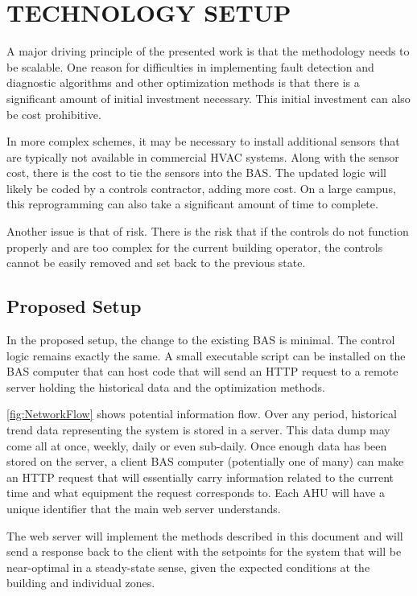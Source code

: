 \chapter{\texorpdfstring{\MakeUppercase{Technology Setup}}{Technology Setup}}

A major driving principle of the presented work is that the methodology
needs to be scalable. One reason for difficulties in implementing fault
detection and diagnostic algorithms and other optimization methods is
that there is a significant amount of initial investment necessary. This
initial investment can also be cost prohibitive. 

In more complex schemes, it may be necessary to install additional
sensors that are typically not available in commercial HVAC systems.
Along with the sensor cost, there is the cost to tie the sensors into the
BAS. The updated logic will likely be coded by a controls contractor,
adding more cost. On a large campus, this reprogramming can also take a
significant amount of time to complete. 

Another issue is that of risk. There is the risk that if the controls do
not function properly and are too complex for the current building
operator, the controls cannot be easily removed and set back to the 
previous state. 


\section{Proposed Setup}

In the proposed setup, the change to the existing BAS is
minimal. The control logic remains exactly the same. A small executable
script can be installed on the BAS computer that can host code that will
send an HTTP request to a remote server holding the historical data and
the optimization methods. 


\figref{} \ref{fig:NetworkFlow} shows potential information flow. Over
any period, historical trend data representing the system is stored in a
server.  This data dump may come all at once, weekly, daily or even
sub-daily.  Once enough data has been stored on the server, a client BAS
computer (potentially one of many) can make an HTTP request that will
essentially carry information related to the current time and what
equipment the request corresponds to. Each AHU will have a unique identifier
that the main web server understands. 

The web server will implement the methods described in this document and
will send a response back to the client with the setpoints for the
system that will be near-optimal in a steady-state sense, given the
expected conditions at the building and individual zones. 


